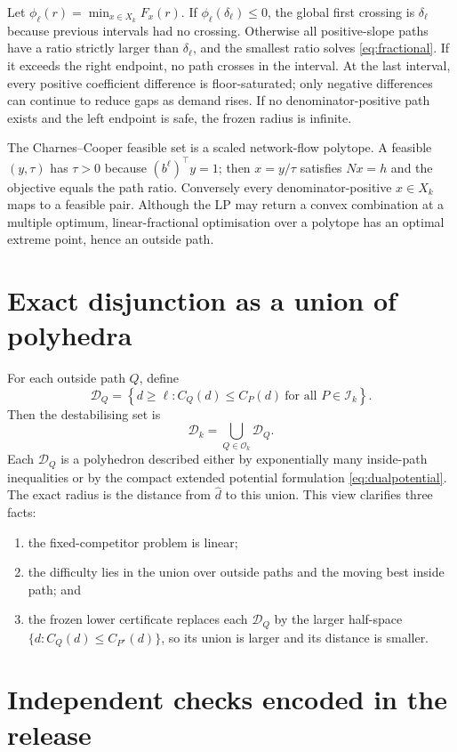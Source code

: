 \documentclass[11pt]{article}
\theoremstyle{definition}
\newcommand{\cI}{\mathcal{I}}
\newcommand{\cO}{\mathcal{O}}
\newcommand{\dhat}{\widehat d}
\newcommand{\ellv}{\ell}
\begin{document}
Let $\phi_\ell(r)=\min_{x\in X_k}F_x(r)$. If $\phi_\ell(\delta_\ell)\le0$, the global first crossing is $\delta_\ell$ because previous intervals had no crossing. Otherwise all positive-slope paths have a ratio strictly larger than $\delta_\ell$, and the smallest ratio solves \eqref{eq:fractional}. If it exceeds the right endpoint, no path crosses in the interval. At the last interval, every positive coefficient difference is floor-saturated; only negative differences can continue to reduce gaps as demand rises. If no denominator-positive path exists and the left endpoint is safe, the frozen radius is infinite.

The Charnes--Cooper feasible set is a scaled network-flow polytope. A feasible $(y,\tau)$ has $\tau>0$ because $(b^\ell)^\top y=1$; then $x=y/\tau$ satisfies $Nx=h$ and the objective equals the path ratio. Conversely every denominator-positive $x\in X_k$ maps to a feasible pair. Although the LP may return a convex combination at a multiple optimum, linear-fractional optimisation over a polytope has an optimal extreme point, hence an outside path.

\section{Exact disjunction as a union of polyhedra}

For each outside path $Q$, define
\[
\mathcal D_Q=
\left\{d\ge\ellv:C_Q(d)\le C_P(d)\ \text{for all }P\in\cI_k\right\}.
\]
Then the destabilising set is
\[
\mathcal D_k=\bigcup_{Q\in\cO_k}\mathcal D_Q.
\]
Each $\mathcal D_Q$ is a polyhedron described either by exponentially many inside-path inequalities or by the compact extended potential formulation \eqref{eq:dualpotential}. The exact radius is the distance from $\dhat$ to this union. This view clarifies three facts:

\begin{enumerate}[label=(\roman*)]
\item the fixed-competitor problem is linear;
\item the difficulty lies in the union over outside paths and the moving best inside path; and
\item the frozen lower certificate replaces each $\mathcal D_Q$ by the larger half-space $\{d:C_Q(d)\le C_{P^\star}(d)\}$, so its union is larger and its distance is smaller.
\end{enumerate}

\section{Independent checks encoded in the release}
\end{document}
